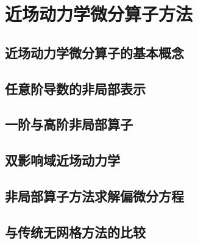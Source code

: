 \chapter{近场动力学微分算子方法}

\section{近场动力学微分算子的基本概念}

\section{任意阶导数的非局部表示}

\section{一阶与高阶非局部算子}

\section{双影响域近场动力学}

\section{非局部算子方法求解偏微分方程}

\section{与传统无网格方法的比较}
